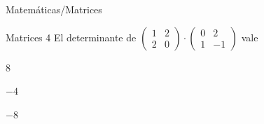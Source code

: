 \documentclass[12pt]{article}
\begin{document}
\begin{quiz}{Matemáticas/Matrices}
 	\begin{multi}[shuffle=true,numbering=none]%
		{Matrices 4}
	 	El determinante de $\begin{pmatrix}
	 		1 & 2 \\ 
	 		2 & 0
	 	\end{pmatrix}\cdot
	 	\begin{pmatrix}
	 		0 & 2 \\ 
	 		1 & -1
	 	\end{pmatrix}$ vale
		\item* $8$ 
		\item $-4$
		\item $-8$
 	\end{multi}	 

	 			
\end{quiz}
\end{document}
